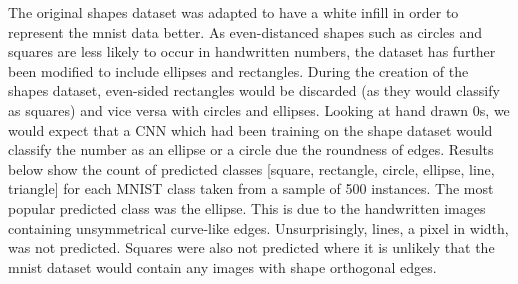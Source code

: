 The original shapes dataset was adapted to have a white infill in order to represent the mnist data better. As even-distanced shapes such as circles and squares are less likely to occur in handwritten numbers, the dataset has further been modified to include ellipses and rectangles. During the creation of the shapes dataset, even-sided rectangles would be discarded (as they would classify as squares) and vice versa with circles and ellipses. Looking at hand drawn 0s, we would expect that a CNN which had been training on the shape dataset would classify the number as an ellipse or a circle due the roundness of edges.
Results below show the count of predicted classes [square, rectangle, circle, ellipse, line, triangle] for each MNIST class taken from a sample of 500 instances. The most popular predicted class was the ellipse. This is due to the handwritten images containing unsymmetrical curve-like edges. Unsurprisingly, lines, a pixel in width, was not predicted.  Squares were also not predicted where it is unlikely that the mnist dataset would contain any images with shape orthogonal edges. 

